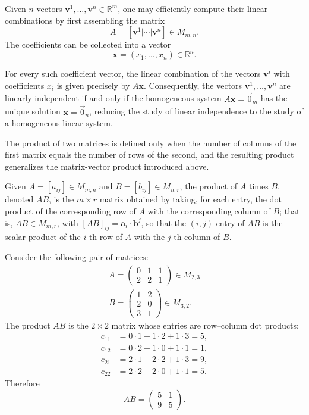 \begin{example}
Given $n$ vectors $\mathbf{v}^1, \dots, \mathbf{v}^n \in \mathbb{R}^m$, one may efficiently compute their linear combinations by first assembling the matrix
\[
A = [\mathbf{v}^1 | \cdots | \mathbf{v}^n] \in M_{m,n}.
\]
The coefficients can be collected into a vector
\[
\mathbf{x} = (x_1, \dots, x_n) \in \mathbb{R}^n.
\]

For every such coefficient vector, the linear combination of the vectors $\mathbf{v}^i$ with coefficients $x_i$ is given precisely by $A\mathbf{x}$. Consequently, the vectors $\mathbf{v}^1, \dots, \mathbf{v}^n$ are linearly independent if and only if the homogeneous system $A\mathbf{x} = \vec{0}_m$ has the unique solution $\mathbf{x} = \vec{0}_n$, reducing the study of linear independence to the study of a homogeneous linear system.
\end{example}

The product of two matrices is defined only when the number of columns of the first matrix equals the number of rows of the second, and the resulting product generalizes the matrix-vector product introduced above.

\begin{definition}
Given $A = [a_{ij}] \in M_{m,n}$ and $B = [b_{ij}] \in M_{n,r}$, the product of $A$ times $B$, denoted $AB$, is the $m \times r$ matrix obtained by taking, for each entry, the dot product of the corresponding row of $A$ with the corresponding column of $B$; that is, $AB \in M_{m,r}$, with $[AB]_{ij} = \mathbf{a}_i \cdot \mathbf{b}^j$, so that the $(i,j)$ entry of $AB$ is the scalar product of the $i$-th row of $A$ with the $j$-th column of $B$.
\end{definition}

\begin{example}
Consider the following pair of matrices:
\[
\begin{gathered}
A = \begin{pmatrix} 0 & 1 & 1 \\ 2 & 2 & 1 \end{pmatrix} \in M_{2,3} \\
B = \begin{pmatrix} 1 & 2 \\ 2 & 0 \\ 3 & 1 \end{pmatrix} \in M_{3,2}.
\end{gathered}
\]
The product $AB$ is the $2\times2$ matrix whose entries are row--column
dot products:
\[
\begin{aligned}
c_{11}&=0\cdot1+1\cdot2+1\cdot3=5,\\
c_{12}&=0\cdot2+1\cdot0+1\cdot1=1,\\
c_{21}&=2\cdot1+2\cdot2+1\cdot3=9,\\
c_{22}&=2\cdot2+2\cdot0+1\cdot1=5.
\end{aligned}
\]
Therefore
\[
AB=\begin{pmatrix}5&1\\9&5\end{pmatrix}.
\]

\end{example}

